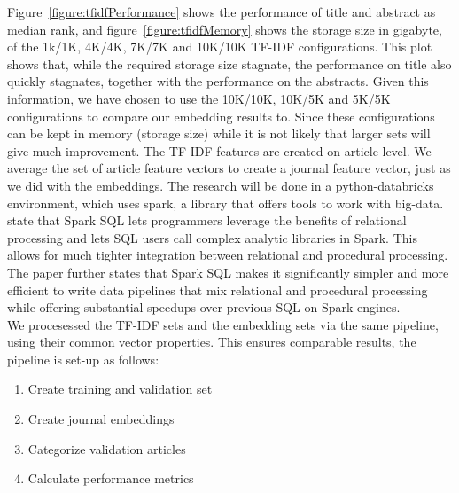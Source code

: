 \documentclass[../../Thesis.tex]{subfiles}
\begin{document}
\FloatBarrier
Figure~\ref{figure:tfidfPerformance} shows the performance of title and abstract as median rank, and figure~\ref{figure:tfidfMemory} shows the storage size in gigabyte, of the 1k/1K, 4K/4K, 7K/7K and 10K/10K TF-IDF configurations. This plot shows that, while the required storage size stagnate, the performance on title also quickly stagnates, together with the performance on the abstracts. Given this information, we have chosen to use the 10K/10K, 10K/5K and 5K/5K configurations to compare our embedding results to. Since these configurations can be kept in memory (storage size) while it is not likely that larger sets will give much improvement. The TF-IDF features are created on article level. We average the set of article feature vectors to create a journal feature vector, just as we did with the embeddings. 
The research will be done in a python-databricks environment, which uses spark, a library that offers tools to work with big-data. \citet{armbrust2015spark} state that Spark SQL lets programmers leverage the benefits of relational processing and lets SQL users call complex analytic libraries in Spark. This allows for much tighter integration between relational and procedural processing. The paper further states that Spark SQL makes it significantly simpler and more efficient to write data pipelines that mix relational and procedural processing while offering substantial speedups over previous SQL-on-Spark engines.\\
We procesessed the TF-IDF sets and the embedding sets via the same pipeline, using their common vector properties. This ensures comparable results, the pipeline is set-up as follows:
\begin{enumerate}
\item{Create training and validation set}
\item{Create journal embeddings}
\item{Categorize validation articles}
\item{Calculate performance metrics}
\end{enumerate}
  
\end{document}
